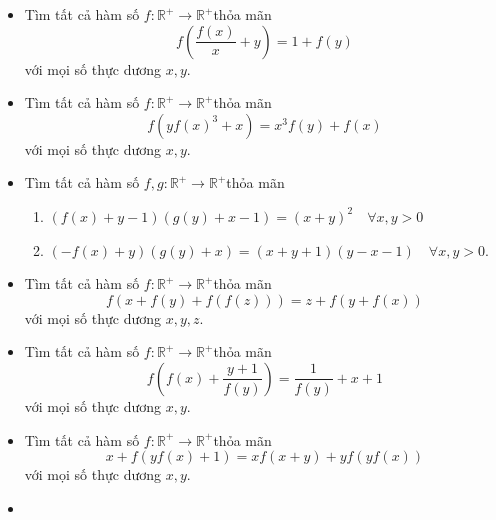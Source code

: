 \documentclass[11pt]{scrartcl}
\begin{document}
\begin{itemize}[label=, leftmargin=0em, itemsep=-0em]
\begin{btvn}
    \end{btvn}
    \item \begin{btvn}
        Tìm tất cả hàm số $f: \mathbb{R}^{+} \rightarrow \mathbb{R}^{+}$thỏa mãn
        $$
        f\left(\frac{f(x)}{x}+y\right)=1+f(y)
        $$
        với mọi số thực dương $x, y$.
    \end{btvn}
    \item \begin{btvn}
        Tìm tất cả hàm số $f: \mathbb{R}^{+} \rightarrow \mathbb{R}^{+}$thỏa mãn
        $$
        f\left(y f(x)^3+x\right)=x^3 f(y)+f(x)
        $$
        với mọi số thực dương $x, y$.
    \end{btvn}
    \item \begin{btvn}
        Tìm tất cả hàm số $f, g: \mathbb{R}^{+} \rightarrow \mathbb{R}^{+}$thỏa mãn
        \begin{enumerate}
            \item $(f(x)+y-1)(g(y)+x-1)=(x+y)^2 \quad \forall x, y>0$
            \item $(-f(x)+y)(g(y)+x)=(x+y+1)(y-x-1) \quad \forall x, y>0$.
        \end{enumerate}
    \end{btvn}
    \item \begin{btvn}
        Tìm tất cả hàm số $f: \mathbb{R}^{+} \rightarrow \mathbb{R}^{+}$thỏa mãn
        $$
        f(x+f(y)+f(f(z)))=z+f(y+f(x))
        $$
        với mọi số thực dương $x, y, z$.
    \end{btvn}
    \item \begin{btvn}
         Tìm tất cả hàm số $f: \mathbb{R}^{+} \rightarrow \mathbb{R}^{+}$thỏa mãn
        $$
        f\left(f(x)+\frac{y+1}{f(y)}\right)=\frac{1}{f(y)}+x+1
        $$
        với mọi số thực dương $x, y$.
    \end{btvn}
    \item \begin{btvn}
         Tìm tất cả hàm số $f: \mathbb{R}^{+} \rightarrow \mathbb{R}^{+}$thỏa mãn
        $$
        x+f(y f(x)+1)=x f(x+y)+y f(y f(x))
        $$
        với mọi số thực dương $x, y$.
    \end{btvn}
    \item \begin{btvn}

\end{btvn}
\end{itemize}
\end{document}
